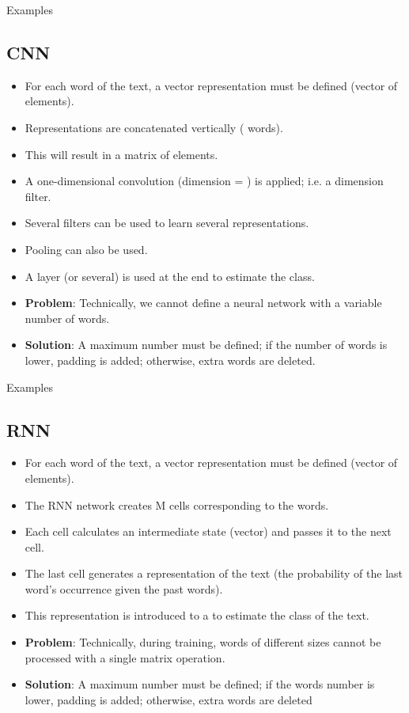 \documentclass{KBook}
\begin{document}
Examples
	
	



\subsection{CNN}

	
	\begin{itemize}
		\item For each word of the text, a vector representation must be defined (vector of  elements).
		\item Representations are concatenated vertically ( words).
		\item This will result in a matrix of  elements.
		\item A one-dimensional convolution (dimension = ) is applied; i.e. a  dimension filter.
		\item Several filters can be used to learn several representations.
		\item Pooling can also be used.
		\item A  layer (or several) is used at the end to estimate the class.
		\item \textbf{Problem}: Technically, we cannot define a neural network with a variable number of words.
		\item \textbf{Solution}: \textcolor{yellow!50}{A maximum number must be defined; if the number of words is lower, padding is added; otherwise, extra words are deleted.}
	\end{itemize}
	
Examples
	
	



\subsection{RNN}
	
	\begin{itemize}
		\item For each word of the text, a vector representation must be defined (vector of  elements).
		\item The RNN network creates M cells corresponding to the  words.
		\item Each cell calculates an intermediate state (vector) and passes it to the next cell.
		\item The last cell generates a representation of the text (the probability of the last word's occurrence given the past words).
		\item This representation is introduced to a  to estimate the class of the text.
		\item \textbf{Problem}: Technically, during training, words of different sizes cannot be processed with a single matrix operation.
		\item \textbf{Solution}: \textcolor{yellow!50}{A maximum number must be defined; if the words number is lower, padding is added; otherwise, extra words are deleted}
	\end{itemize}
	
\end{document}

